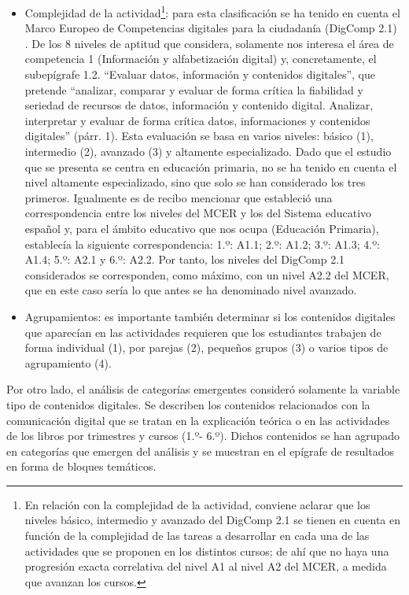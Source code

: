 \documentclass[spanish]{textolivre}
\begin{document}
\begin{itemize}
    \item Complejidad de la actividad\footnote{En relación con la complejidad de la actividad, conviene aclarar que los niveles básico, intermedio y avanzado del DigComp 2.1 \cite{carretero_2018} se tienen en cuenta en función de la complejidad de las tareas a desarrollar en cada una de las actividades que se proponen en los distintos cursos; de ahí que no haya una progresión exacta correlativa del nivel A1 al nivel A2 del MCER, a medida que avanzan los cursos.}: para esta clasificación se ha tenido en cuenta el Marco Europeo de Competencias digitales para la ciudadanía (DigComp 2.1) \cite{carretero_2018}. De los 8 niveles de aptitud que considera, solamente nos interesa el área de competencia 1 (Información y alfabetización digital) y, concretamente, el subepígrafe 1.2. “Evaluar datos, información y contenidos digitales”, que pretende “analizar, comparar y evaluar de forma crítica la fiabilidad y seriedad de recursos de datos, información y contenido digital. Analizar, interpretar y evaluar de forma crítica datos, informaciones y contenidos digitales” (párr. 1). Esta evaluación se basa en varios niveles: básico (1), intermedio (2), avanzado (3) y altamente especializado. Dado que el estudio que se presenta se centra en educación primaria, no se ha tenido en cuenta el nivel altamente especializado, sino que solo se han considerado los tres primeros. Igualmente es de recibo mencionar que \textcite{gisbert_da_cruz_niveles_2011} estableció una correspondencia entre los niveles del MCER y los del Sistema educativo español y, para el ámbito educativo que nos ocupa (Educación Primaria), establecía la siguiente correspondencia: 1.º: A1.1; 2.º: A1.2; 3.º: A1.3; 4.º: A1.4; 5.º: A2.1 y 6.º: A2.2. Por tanto, los niveles del DigComp 2.1 considerados se corresponden, como máximo, con un nivel A2.2 del MCER, que en este caso sería lo que antes se ha denominado nivel avanzado.
    \item Agrupamientos: es importante también determinar si los contenidos digitales que aparecían en las actividades requieren que los estudiantes trabajen de forma individual (1), por parejas (2), pequeños grupos (3) o varios tipos de agrupamiento (4).
\end{itemize}

Por otro lado, el análisis de categorías emergentes consideró solamente la variable tipo de contenidos digitales. Se describen los contenidos relacionados con la comunicación digital que se tratan en la explicación teórica o en las actividades de los libros por trimestres y cursos (1.º- 6.º). Dichos contenidos se han agrupado en categorías que emergen del análisis y se muestran en el epígrafe de resultados en forma de bloques temáticos.
\end{document}
